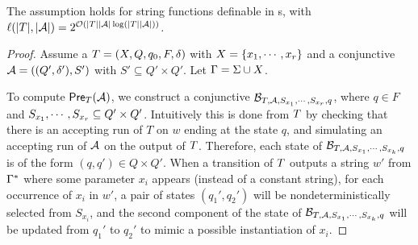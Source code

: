 \begin{lemma}\label{lem-2pt}
The \prerec{} assumption holds for string functions definable in \PPT{}s, with $\ell(|T|, |\mathcal{A}|) = 2^{\mathcal{O}(|T||\mathcal{A}|\log (|T||\mathcal{A}|))}$.
\end{lemma}

\begin{proof}
Assume a \PPT{} $T=(X, Q, q_0, F, \delta)$ with $X = \{x_1,\cdots, x_r\}$ and a conjunctive \FA{} $\mathcal{A} = ((Q', \delta'), S')$ with $S' \subseteq Q' \times Q'$. %
Let $\Gamma = \Sigma \cup X$.

To compute $\textsf{Pre}_{T}(\mathcal{A})$, we construct a conjunctive \FFA{} %
$\mathcal{B}_{T, \mathcal{A}, S_{x_1}, \cdots, S_{x_r}, q}$, %
%
where  $q \in F$ and  $S_{x_1}, \cdots, S_{x_r} \subseteq Q' \times Q'$.   
Intuitively this is done from $T$  by checking that there is an accepting run of $T$ on $w$ ending at the state $q$, and simulating an accepting run of $\mathcal{A}$ on the output of $T$. Therefore, each state of $\mathcal{B}_{T, \mathcal{A}, S_{x_1}, \cdots, S_{x_k}, q}$ is of the form $(q,q') \in Q \times Q'$. 
When a transition of $T$ outputs a string $w'$ from $\Gamma^*$ where some parameter $x_i$ appears (instead of a constant string), for each occurrence of $x_i$ in $w'$, a pair of states $(q_1', q_2')$ will be nondeterministically selected from $S_{x_i}$, and the second component of the state of $\mathcal{B}_{T, \mathcal{A}, S_{x_1}, \cdots, S_{x_k}, q}$ will be updated from $q_1'$ to $q_2'$ to mimic a possible instantiation of $x_i$.  




\end{proof}
